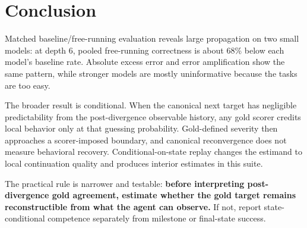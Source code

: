 \documentclass{article}
\begin{document}
\section{Conclusion}

Matched baseline/free-running evaluation reveals large propagation on two small models: at depth 6, pooled free-running correctness is about 68\% below each model's baseline rate. Absolute excess error and error amplification show the same pattern, while stronger models are mostly uninformative because the tasks are too easy.

The broader result is conditional. When the canonical next target has negligible predictability from the post-divergence observable history, any gold scorer credits local behavior only at that guessing probability. Gold-defined severity then approaches a scorer-imposed boundary, and canonical reconvergence does not measure behavioral recovery. Conditional-on-state replay changes the estimand to local continuation quality and produces interior estimates in this suite.

The practical rule is narrower and testable: \textbf{before interpreting post-divergence gold agreement, estimate whether the gold target remains reconstructible from what the agent can observe.} If not, report state-conditional competence separately from milestone or final-state success.
\end{document}

